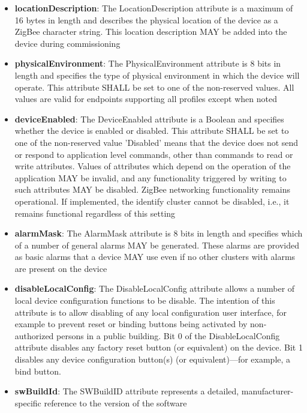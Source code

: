 \begin{itemize}
\item \textbf{locationDescription}: The LocationDescription attribute is a maximum of 16 bytes in length and describes the physical location of the device as a ZigBee character string. This location description MAY be added into the device during commissioning
\item \textbf{physicalEnvironment}: The PhysicalEnvironment attribute is 8 bits in length and specifies the type of physical environment in which the device will operate. This attribute SHALL be set to one of the non-reserved values. All values are valid for endpoints supporting all profiles except when noted
\item \textbf{deviceEnabled}: The DeviceEnabled attribute is a Boolean and specifies whether the device is enabled or disabled. This attribute SHALL be set to one of the non-reserved value 'Disabled' means that the device does not send or respond to application level commands, other than commands to read or write attributes. Values of attributes which depend on the operation of the application MAY be invalid, and any functionality triggered by writing to such attributes MAY be disabled. ZigBee networking functionality remains operational. If implemented, the identify cluster cannot be disabled, i.e., it remains functional regardless of this setting
\item \textbf{alarmMask}: The AlarmMask attribute is 8 bits in length and specifies which of a number of general alarms MAY be generated. These alarms are provided as basic alarms that a device MAY use even if no other clusters with alarms are present on the device
\item \textbf{disableLocalConfig}: The DisableLocalConfig attribute allows a number of local device configuration functions to be disable. The intention of this attribute is to allow disabling of any local configuration user interface, for example to prevent reset or binding buttons being activated by non-authorized persons in a public building. Bit 0 of the DisableLocalConfig attribute disables any factory reset button (or equivalent) on the device. Bit 1 disables any device configuration button(s) (or equivalent)—for example, a bind button.
\item \textbf{swBuildId}: The SWBuildID attribute represents a detailed, manufacturer-specific reference to the version of the software
\end{itemize}


